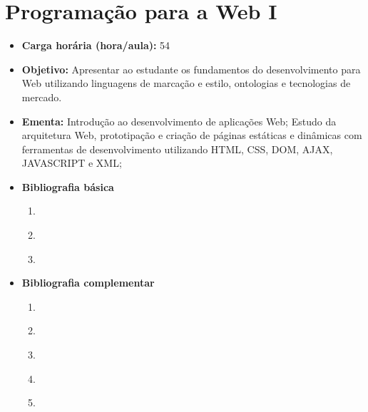 \documentclass[11pt,fleqn]{book} %
\begin{document}


\newpage
\section{Programação para a Web I}\label{4_ppw1}
\begin{itemize}
	\item \textbf{Carga horária (hora/aula):} 54
	\item \textbf{Objetivo:} Apresentar ao estudante os fundamentos do desenvolvimento para Web utilizando linguagens de marcação e estilo, ontologias e tecnologias de mercado.
	\item \textbf{Ementa:} 
	Introdução ao desenvolvimento de aplicações Web;
	Estudo da arquitetura Web, prototipação e criação de páginas estáticas e dinâmicas com ferramentas de desenvolvimento utilizando HTML, CSS, DOM, AJAX, JAVASCRIPT e XML;
	\item \textbf{Bibliografia básica}
	\begin{enumerate}
		\item \cite{rodrigues_2010}
		\item \cite{ducket_2010}
		\item \cite{goncalves_2007}
	\end{enumerate}
	\item \textbf{Bibliografia complementar}
	\begin{enumerate}
		\item \cite{silva_2008}
		\item \cite{silva_2014}
		\item \cite{silva_2014a}
		\item \cite{marcondes_2009}
		\item \cite{cartilha2012}
	\end{enumerate}
\end{itemize}


\newpage
\end{document}
